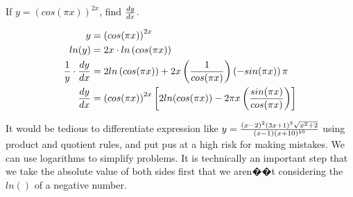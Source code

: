 \begin{exercise}\nonumber
    If $ y = \left(cos(\pi x)\right)^{2x} $, find $  dy \over dx $.

    \begin{align}
        y                               & = \left(cos(\pi x)\right)^{2x}                                                                                \\
        ln(y)                           & = 2x \cdot ln\left(cos(\pi x)\right)                                                                          \\
        {1 \over y} \cdot {dy \over dx} & = 2ln\left(cos(\pi x)\right) + 2x\left({1 \over cos(\pi x)}\right)\left(-sin(\pi x)\right)\pi                 \\
        {dy \over dx}                   & = \left(cos(\pi x)\right)^{2x}\left[2ln(cos(\pi x)) - 2\pi x\left({sin(\pi x) \over cos(\pi x)}\right)\right]
    \end{align}
\end{exercise}

It would be tedious to differentiate expression like $ y = {(x-2)^2(3x+1)^3\sqrt{x^2+2} \over (x-1)(x+10)^{10}} $ using product and quotient rules, and put pus at a high risk for making mistakes. We can use logarithms to simplify problems. It is technically an important step that we take the absolute value of both sides first that we aren��t considering the $ ln() $ of a negative number. \\

